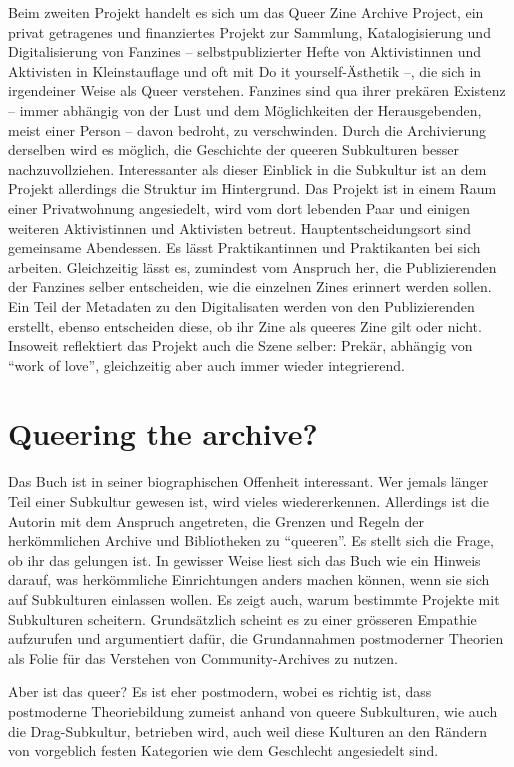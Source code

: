 \documentclass[a4paper,
fontsize=11pt,
oneside,
numbers=noperiodatend,
parskip=half-,
bibliography=totoc,
final
]{scrartcl}
\begin{document}
Beim zweiten Projekt handelt es sich um das Queer Zine Archive Project,
ein privat getragenes und finanziertes Projekt zur Sammlung,
Katalogisierung und Digitalisierung von Fanzines -- selbstpublizierter
Hefte von Aktivistinnen und Aktivisten in Kleinstauflage und oft mit Do
it yourself-Ästhetik --, die sich in irgendeiner Weise als Queer
verstehen. Fanzines sind qua ihrer prekären Existenz -- immer abhängig
von der Lust und dem Möglichkeiten der Herausgebenden, meist einer
Person -- davon bedroht, zu verschwinden. Durch die Archivierung
derselben wird es möglich, die Geschichte der queeren Subkulturen besser
nachzuvollziehen. Interessanter als dieser Einblick in die Subkultur ist
an dem Projekt allerdings die Struktur im Hintergrund. Das Projekt ist
in einem Raum einer Privatwohnung angesiedelt, wird vom dort lebenden
Paar und einigen weiteren Aktivistinnen und Aktivisten betreut.
Hauptentscheidungsort sind gemeinsame Abendessen. Es lässt
Praktikantinnen und Praktikanten bei sich arbeiten. Gleichzeitig lässt
es, zumindest vom Anspruch her, die Publizierenden der Fanzines selber
entscheiden, wie die einzelnen Zines erinnert werden sollen. Ein Teil
der Metadaten zu den Digitalisaten werden von den Publizierenden
erstellt, ebenso entscheiden diese, ob ihr Zine als queeres Zine gilt
oder nicht. Insoweit reflektiert das Projekt auch die Szene selber:
Prekär, abhängig von \enquote{work of love}, gleichzeitig aber auch
immer wieder integrierend.

\section*{Queering the archive?}\label{queering-the-archive}

Das Buch ist in seiner biographischen Offenheit interessant. Wer jemals
länger Teil einer Subkultur gewesen ist, wird vieles wiedererkennen.
Allerdings ist die Autorin mit dem Anspruch angetreten, die Grenzen und
Regeln der herkömmlichen Archive und Bibliotheken zu \enquote{queeren}.
Es stellt sich die Frage, ob ihr das gelungen ist. In gewisser Weise
liest sich das Buch wie ein Hinweis darauf, was herkömmliche
Einrichtungen anders machen können, wenn sie sich auf Subkulturen
einlassen wollen. Es zeigt auch, warum bestimmte Projekte mit
Subkulturen scheitern. Grundsätzlich scheint es zu einer grösseren
Empathie aufzurufen und argumentiert dafür, die Grundannahmen
postmoderner Theorien als Folie für das Verstehen von Community-Archives
zu nutzen.

Aber ist das queer? Es ist eher postmodern, wobei es richtig ist, dass
postmoderne Theoriebildung zumeist anhand von queere Subkulturen, wie
auch die Drag-Subkultur, betrieben wird, auch weil diese Kulturen an den
Rändern von vorgeblich festen Kategorien wie dem Geschlecht angesiedelt
sind.
\end{document}

